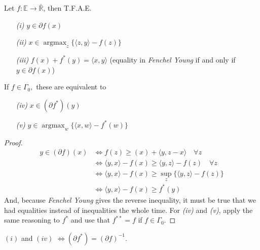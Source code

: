 \documentclass{tufte-handout}
\DeclareMathOperator{\argmax}{argmax}
\begin{document}
{{\begin{proposition}
  \end{proposition}
 \begin{theorem} \label{label}
  Let $f: \mathbb{E} \to \mathbb{\bar R}$, then T.F.A.E. 
   \begin{enumerate}
     \item[\it (i)] $y \in \partial f(x)$
     \item[\it (ii)] $x \in \argmax_z \{\langle z, y \rangle - f(z)\}$
     \item[\it (iii)] $f(x) + f^* (y) = \langle x, y \rangle$ (equality in \textit{Fenchel Young} if and only if $y\in \partial f(x)$) 
   \end{enumerate}
   If $f\in \Gamma_0,$ these are equivalent to 
   \begin{enumerate}
     \item[\it (iv)] $x \in (\partial f^*) (y)$ 
     \item[\it (v)] $y \in \argmax_w \{ \langle x, w \rangle - f^* (w)\}$
   \end{enumerate}
   \begin{proof} 
     \begin{equation*}
      \begin{split}
        y \in (\partial f)(x) &\iff f(z) \geq (x) + \langle y, z-x\rangle \quad \forall z \\ 
        & \iff \langle y, x \rangle - f(x) \geq \langle y, z\rangle - f(z) \quad \forall z \\ 
        & \iff \langle y, x \rangle - f(x) \geq  \sup_z \{  \langle y, z\rangle - f(z)  \} \\ 
        &\iff \langle y, x \rangle - f(x) \geq f^*(y)
      \end{split}
     \end{equation*}
     And, because \textit{Fenchel Young} gives the reverse inequality, it must be true that we had equalities instead of inequalities the whole time. For \textit{(iv)} and \textit{(v)},  apply the same reasoning to $f^*$ and use that $f^{**} = f$ if $f\in \Gamma_0.$  
   \end{proof}
 \end{theorem} 
  \begin{remark} 
    $(i)$ and $(iv)$ $\iff (\partial f^*) = (\partial f)^{-1}$. 
  \end{remark}
}}
\end{document}

